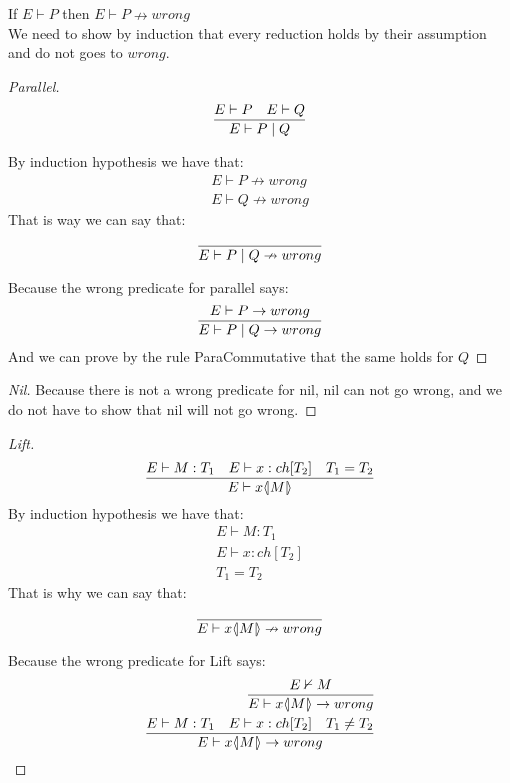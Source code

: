 \begin{theorem}
If \ensuremath{E \vdash P} then \ensuremath{E \vdash P \nrightarrow wrong}\\
We need to show by induction that every reduction holds by their assumption and do not goes to \ensuremath{wrong}.
\begin{proof}[Parallel]
\begin{align*}
\frac{E \vdash P \quad E \vdash Q }{E \vdash P \mid Q}
\end{align*}

By induction hypothesis we have that: 
\begin{align*}
E \vdash P \nrightarrow wrong\\
E \vdash Q \nrightarrow wrong
\end{align*}
That is way we can say that:
\begin{align*}
\frac{}{E \vdash P \mid Q \nrightarrow wrong}
\end{align*}

Because the wrong predicate for parallel says:
\begin{align*}
\frac{E \vdash P \rightarrow wrong}{E \vdash P \mid Q \rightarrow wrong}
\end{align*}
And we can prove by the rule ParaCommutative that the same holds for \ensuremath{Q}
\end{proof}

\begin{proof}[Nil]
Because there is not a wrong predicate for nil, nil can not go wrong, and we do not have to show that nil will not go wrong.
\end{proof}

\begin{proof}[Lift]
\begin{align*}
\frac{E \vdash M:T_1 \quad E \vdash x:ch[T_2] \quad T_1 = T_2}{E \vdash x \langle \! | M | \! \rangle}
\end{align*}
By induction hypothesis we have that:
\begin{align*}
E \vdash M:T_1\\
E \vdash x:ch[T_2]\\
T_1 = T_2
\end{align*}
That is why we can say that:
\begin{align*}
\frac{}{E \vdash x \langle \! | M | \! \rangle \nrightarrow wrong}
\end{align*}

Because the wrong predicate for Lift says:
\begin{align*}
\frac{E \nvdash M}{E \vdash x \langle \! | M | \! \rangle \rightarrow wrong}\\
\frac{E \vdash M:T_1 \quad E \vdash x:ch[T_2] \quad T_1 \neq T_2}{E \vdash x \langle \! | M | \! \rangle \rightarrow wrong}
\end{align*}


\end{proof}
\end{theorem}
